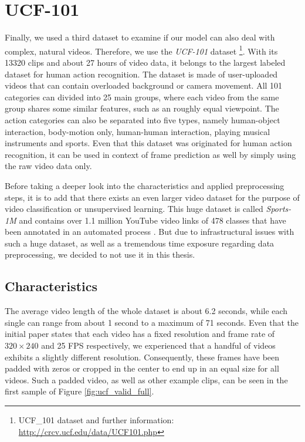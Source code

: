\section{UCF-101} \label{sec:ds_ucf}

Finally, we used a third dataset to examine if our model can also deal with complex, natural videos. Therefore, we use the \textit{UCF-101} dataset \parencite{ucf}\footnote{UCF_101 dataset and further information: \url{http://crcv.ucf.edu/data/UCF101.php}}. With its \num{13320} clips and about \num{27} hours of video data, it belongs to the largest labeled dataset for human action recognition. The dataset is made of user-uploaded videos that can contain overloaded background or camera movement. All \num{101} categories can divided into \num{25} main groups,  where each video from the same group shares some similar features, such as an roughly equal viewpoint. The action categories can also be separated into five types, namely human-object interaction, body-motion only, human-human interaction, playing musical instruments and sports. Even that this dataset was originated for human action recognition, it can be used in context of frame prediction as well by simply using the raw video data only.

Before taking a deeper look into the characteristics and applied preprocessing steps, it is to add that there exists an even larger video dataset for the purpose of video classification or unsupervised learning. This huge dataset is called \textit{Sports-1M} and contains over \num{1.1} million YouTube video links of \num{478} classes that have been annotated in an automated process \parencite{large_video_class}. But due to infrastructural issues with such a huge dataset, as well as a tremendous time exposure regarding data preprocessing, we decided to not use it in this thesis.


\subsection{Characteristics}

The average video length of the whole dataset is about \num{6.2} seconds, while each single can range from about \num{1} second to a maximum of \num{71} seconds. Even that the initial paper states that each video has a fixed resolution and frame rate of $ 320 \times 240 $ and \num{25} FPS respectively, we experienced that a handful of videos exhibits a slightly different resolution. Consequently, these frames have been padded with zeros or cropped in the center to end up in an equal size for all videos. Such a padded video, as well as other example clips, can be seen in the first sample of Figure \ref{fig:ucf_valid_full}.

